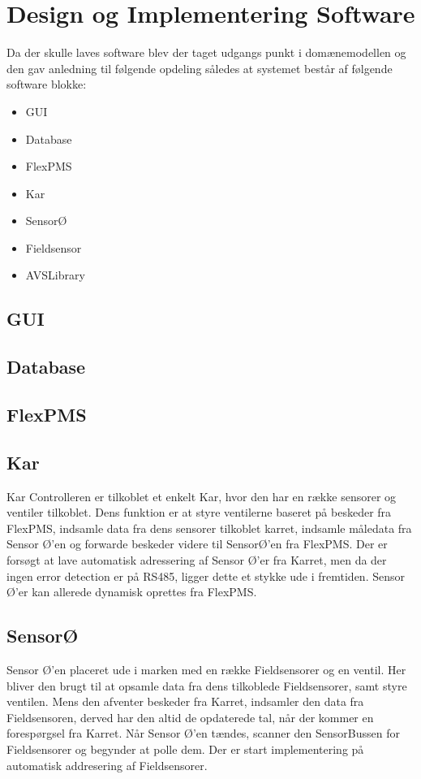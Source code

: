 \section{Design og Implementering Software}
Da der skulle laves software blev der taget udgangs punkt i domænemodellen og den gav anledning til følgende opdeling således at
systemet består af følgende software blokke:
\begin{itemize}
\item GUI
\item Database
\item FlexPMS
\item Kar
\item SensorØ
\item Fieldsensor
\item AVSLibrary
\end{itemize}

\subsection{GUI}

\subsection{Database}

\subsection{FlexPMS}

\subsection{Kar}
Kar Controlleren er tilkoblet et enkelt Kar, hvor den har en række sensorer og ventiler tilkoblet. Dens funktion er at styre ventilerne baseret på beskeder fra FlexPMS, indsamle data fra dens sensorer tilkoblet karret, indsamle måledata fra Sensor Ø'en og forwarde beskeder videre til SensorØ'en fra FlexPMS. Der er forsøgt at lave automatisk adressering af Sensor Ø'er fra Karret, men da der ingen error detection er på RS485, ligger dette et stykke ude i fremtiden. Sensor Ø'er kan allerede dynamisk oprettes fra FlexPMS.

\subsection{SensorØ}
Sensor Ø'en placeret ude i marken med en række Fieldsensorer og en ventil. Her bliver den brugt til at opsamle data fra dens tilkoblede Fieldsensorer, samt styre ventilen. Mens den afventer beskeder fra Karret, indsamler den data fra Fieldsensoren, derved har den altid de opdaterede tal, når der kommer en forespørgsel fra Karret. Når Sensor Ø'en tændes, scanner den SensorBussen for Fieldsensorer og begynder at polle dem. Der er start implementering på automatisk addresering af Fieldsensorer. 

